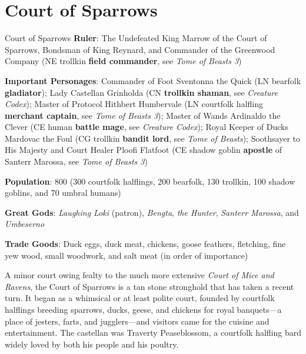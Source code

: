 \documentclass[10pt,a4paper,twoside,bg=print,twocolumn,openany,nodeprecatedcode]{dndbook}
\begin{document}
\section{Court of Sparrows}
\begin{DndSidebar}[float=!b]{Court of Sparrows}
\textbf{Ruler}: The Undefeated King Marrow of the Court of Sparrows, Bondsman of King Reynard, and Commander of the Greenwood Company (NE trollkin \textbf{field commander}, see \textit{Tome of Beasts 3})



\textbf{Important Personages}: Commander of Foot Sventonna the Quick (LN bearfolk \textbf{gladiator}); Lady Castellan Grinholda (CN \textbf{trollkin shaman}, see \textit{Creature Codex}); Master of Protocol Hithbert Humbervale (LN courtfolk halfling \textbf{merchant captain}, see \textit{Tome of Beasts 3}); Master of Wands Ardinaldo the Clever (CE human \textbf{battle mage}, see \textit{Creature Codex}); Royal Keeper of Ducks Mardovac the Foul (CG trollkin \textbf{bandit lord}, see \textit{Tome of Beasts}); Soothsayer to His Majesty and Court Healer Ploofi Flatfoot (CE shadow goblin \textbf{apostle} of Santerr Marossa, see \textit{Tome of Beasts 3})



\textbf{Population}: 800 (300 courtfolk halflings, 200 bearfolk, 130 trollkin, 100 shadow goblins, and 70 umbral humans)



\textbf{Great Gods}: \textit{Laughing Loki} (patron), \textit{Bengta}, \textit{the Hunter}, \textit{Santerr Marossa}, and \textit{Umbeserno}



\textbf{Trade Goods}: Duck eggs, duck meat, chickens, goose feathers, fletching, fine yew wood, small woodwork, and salt meat (in order of importance)





\end{DndSidebar}

A minor court owing fealty to the much more extensive \textit{Court of Mice and Ravens}, the Court of Sparrows is a tan stone stronghold that has taken a recent turn. It began as a whimsical or at least polite court, founded by courtfolk halflings breeding sparrows, ducks, geese, and chickens for royal banquets—a place of jesters, farts, and jugglers—and visitors came for the cuisine and entertainment. The castellan was Traverty Peaseblossom, a courtfolk halfling bard widely loved by both his people and his poultry.
\end{document}

